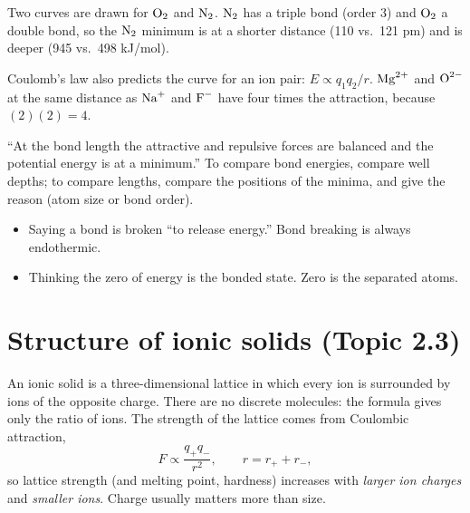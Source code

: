 \documentclass[11pt]{article}
\begin{document}
 Two curves are drawn for $\ce{O2}$ and $\ce{N2}$. $\ce{N2}$ has a triple bond (order 3) and $\ce{O2}$ a double bond, so the $\ce{N2}$ minimum is at a shorter distance (110 vs.\ 121 pm) and is deeper (945 vs.\ 498 kJ/mol).

 Coulomb's law also predicts the curve for an ion pair: $E \propto q_1q_2/r$. $\ce{Mg^2+}$ and $\ce{O^2-}$ at the same distance as $\ce{Na+}$ and $\ce{F-}$ have four times the attraction, because $(2)(2) = 4$.

\frph ``At the bond length the attractive and repulsive forces are balanced and the potential energy is at a minimum.'' To compare bond energies, compare well depths; to compare lengths, compare the positions of the minima, and give the reason (atom size or bond order).

\errorsh
\begin{itemize}
\item Saying a bond is broken ``to release energy.'' Bond breaking is always endothermic.
\item Thinking the zero of energy is the bonded state. Zero is the separated atoms.
\end{itemize}

\section{Structure of ionic solids (Topic 2.3)}\label{t:2.3}
An ionic solid is a three-dimensional lattice in which every ion is surrounded by ions of the opposite charge. There are no discrete molecules: the formula gives only the ratio of ions. The strength of the lattice comes from Coulombic attraction,
\[ F \propto \frac{q_+ q_-}{r^2}, \qquad r = r_+ + r_- , \]
so lattice strength (and melting point, hardness) increases with \emph{larger ion charges} and \emph{smaller ions}. Charge usually matters more than size.
\end{document}
